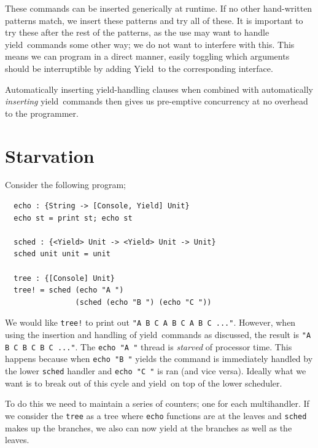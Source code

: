 \documentclass[msc,deptreport,cs]{infthesis} %
\newcommand{\code}[1]{\lstinline{#1}}
\newcommand\yield{\textsf{yield}\xspace}
\newcommand\Yield{\textsf{Yield}\xspace}
\begin{document}

These commands can be inserted generically at runtime. If no other hand-written
patterns match, we insert these patterns and try all of these. It is important
to try these after the rest of the patterns, as the use may want to handle
\yield~commands some other way; we do not want to interfere with this. This
means we can program in a direct manner, easily toggling which arguments
should be interruptible by adding \Yield~to the corresponding interface.

Automatically inserting \yield-handling clauses when combined with automatically
\emph{inserting} \yield~commands then gives us pre-emptive concurrency at no
overhead to the programmer.

\section{Starvation}

Consider the following program;

\begin{lstlisting}
  echo : {String -> [Console, Yield] Unit}
  echo st = print st; echo st

  sched : {<Yield> Unit -> <Yield> Unit -> Unit}
  sched unit unit = unit

  tree : {[Console] Unit}
  tree! = sched (echo "A ")
                (sched (echo "B ") (echo "C "))
\end{lstlisting}

We would like \code{tree!} to print out \code{"A B C A B C A B C ..."}. However, when
using the insertion and handling of \yield~commands as discussed, the result is
\code{"A B C B C B C ..."}. The \code{echo "A "} thread is \emph{starved} of
processor time. This happens because when \code{echo "B "} yields the command
is immediately handled by the lower \code{sched} handler and \code{echo "C "}
is ran (and vice versa). Ideally what we want is to break out of this cycle
and \yield~on top of the lower scheduler.

To do this we need to maintain a series of counters; one for each multihandler.
If we consider the \code{tree} as a tree where \code{echo} functions are at
the leaves and \code{sched} makes up the branches, we also can now yield at the
branches as well as the leaves.
\end{document}
